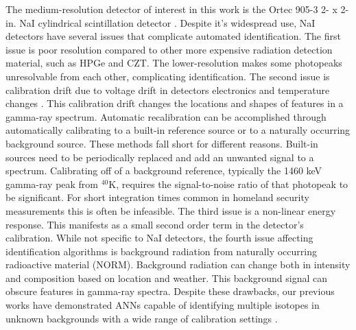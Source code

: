 The medium-resolution detector of interest in this work is the Ortec 905-3 2- x 2-in. NaI cylindrical scintillation detector \cite{Hofstadter1948}. Despite it's widespread use, NaI detectors have several issues that complicate automated identification. The first issue is poor resolution compared to other more expensive radiation detection material, such as HPGe and CZT. The lower-resolution makes some photopeaks unresolvable from each other, complicating identification. The second issue is calibration drift due to voltage drift in detectors electronics and temperature changes \cite{knoll,gilmore}. This calibration drift changes the locations and shapes of features in a gamma-ray spectrum. Automatic recalibration can be accomplished through automatically calibrating to a built-in reference source or to a naturally occurring background source. These methods fall short for different reasons. Built-in sources need to be periodically replaced and add an unwanted signal to a spectrum. Calibrating off of a background reference, typically the 1460 keV gamma-ray peak from $^{40}$K, requires the signal-to-noise ratio of that photopeak to be significant. For short integration times common in homeland security measurements this is often be infeasible. The third issue is a non-linear energy response. This manifests as a small second order term in the detector's calibration. While not specific to NaI detectors, the fourth issue affecting identification algorithms is background radiation from naturally occurring radioactive material (NORM). Background radiation can change both in intensity and composition based on location and weather. This background signal can obscure features in gamma-ray spectra. Despite these drawbacks, our previous works have demonstrated ANNs capable of identifying multiple isotopes in unknown backgrounds with a wide range of calibration settings \cite{kamudaThesis2017,kamuda2017}.





